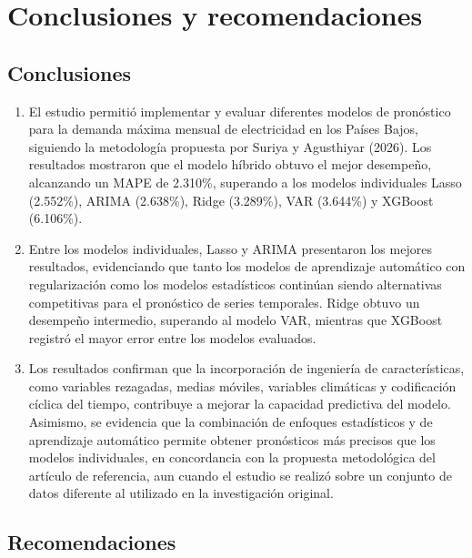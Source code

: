 \section*{Conclusiones y recomendaciones}

\subsection*{Conclusiones}

\begin{enumerate}
    \item El estudio permitió implementar y evaluar diferentes modelos de pronóstico para la demanda máxima mensual de electricidad en los Países Bajos, siguiendo la metodología propuesta por Suriya y Agusthiyar (2026). Los resultados mostraron que el modelo híbrido obtuvo el mejor desempeño, alcanzando un MAPE de 2.310\%, superando a los modelos individuales Lasso (2.552\%), ARIMA (2.638\%), Ridge (3.289\%), VAR (3.644\%) y XGBoost (6.106\%).

    \item Entre los modelos individuales, Lasso y ARIMA presentaron los mejores resultados, evidenciando que tanto los modelos de aprendizaje automático con regularización como los modelos estadísticos continúan siendo alternativas competitivas para el pronóstico de series temporales. Ridge obtuvo un desempeño intermedio, superando al modelo VAR, mientras que XGBoost registró el mayor error entre los modelos evaluados.

    \item Los resultados confirman que la incorporación de ingeniería de características, como variables rezagadas, medias móviles, variables climáticas y codificación cíclica del tiempo, contribuye a mejorar la capacidad predictiva del modelo. Asimismo, se evidencia que la combinación de enfoques estadísticos y de aprendizaje automático permite obtener pronósticos más precisos que los modelos individuales, en concordancia con la propuesta metodológica del artículo de referencia, aun cuando el estudio se realizó sobre un conjunto de datos diferente al utilizado en la investigación original.
\end{enumerate}

\subsection*{Recomendaciones}

